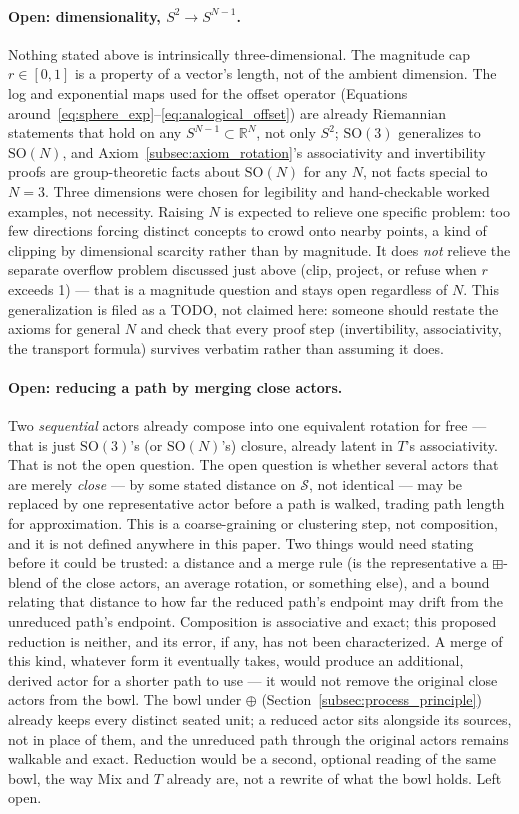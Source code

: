 \documentclass[12pt, a4paper]{article}
\begin{document}
\paragraph{Open: dimensionality, $S^2 \to S^{N-1}$.} Nothing stated
above is intrinsically three-dimensional. The magnitude cap
$r\in[0,1]$ is a property of a vector's length, not of the ambient
dimension. The log and exponential maps used for the offset operator
(Equations around~\eqref{eq:sphere_exp}--\eqref{eq:analogical_offset})
are already Riemannian statements that hold on any $S^{N-1}\subset
\mathbb{R}^N$, not only $S^2$; $\mathrm{SO}(3)$ generalizes to
$\mathrm{SO}(N)$, and Axiom~\ref{subsec:axiom_rotation}'s
associativity and invertibility proofs are group-theoretic facts
about $\mathrm{SO}(N)$ for any $N$, not facts special to $N=3$. Three
dimensions were chosen for legibility and hand-checkable worked
examples, not necessity. Raising $N$ is expected to relieve one
specific problem: too few directions forcing distinct concepts to
crowd onto nearby points, a kind of clipping by dimensional scarcity
rather than by magnitude. It does \emph{not} relieve the separate
overflow problem discussed just above (clip, project, or refuse when
$r$ exceeds 1) --- that is a magnitude question and stays open
regardless of $N$. This generalization is filed as a TODO, not
claimed here: someone should restate the axioms for general $N$ and
check that every proof step (invertibility, associativity, the
transport formula) survives verbatim rather than assuming it does.

\paragraph{Open: reducing a path by merging close actors.} Two
\emph{sequential} actors already compose into one equivalent rotation
for free --- that is just $\mathrm{SO}(3)$'s (or $\mathrm{SO}(N)$'s)
closure, already latent in $T$'s associativity. That is not the open
question. The open question is whether several actors that are
merely \emph{close} --- by some stated distance on $\mathcal{S}$, not
identical --- may be replaced by one representative actor before a
path is walked, trading path length for approximation. This is a
coarse-graining or clustering step, not composition, and it is not
defined anywhere in this paper. Two things would need stating before
it could be trusted: a distance and a merge rule (is the
representative a $\boxplus$-blend of the close actors, an average
rotation, or something else), and a bound relating that distance to
how far the reduced path's endpoint may drift from the unreduced
path's endpoint. Composition is associative and exact;
this proposed reduction is neither, and its error, if any, has not
been characterized.
A merge of this kind, whatever form it eventually takes, would
produce an additional, derived actor for a shorter path to use --- it
would not remove the original close actors from the bowl. The bowl
under $\oplus$ (Section~\ref{subsec:process_principle}) already keeps
every distinct seated unit; a reduced actor sits alongside its
sources, not in place of them, and the unreduced path through the
original actors remains walkable and exact. Reduction would be a
second, optional reading of the same bowl, the way Mix and $T$
already are, not a rewrite of what the bowl holds. Left open.
\end{document}
